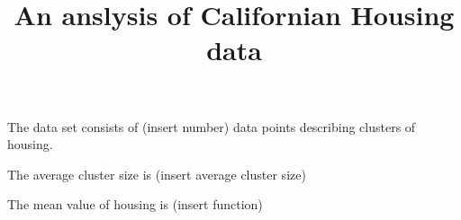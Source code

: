 \documentclass{article}
\title{An anslysis of Californian Housing data}
\begin{document}
    \maketitle

    The data set consists of (insert number) data points describing clusters of housing.
    
    
    The average cluster size is (insert average cluster size)



    The mean value of housing is (insert function)
\end{document}
